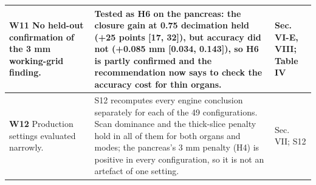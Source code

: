 \documentclass[11pt]{article}
\begin{document}
\begin{longtable}{@{}>{\raggedright\arraybackslash}p{}>{\raggedright\arraybackslash}p{}>{\raggedright\arraybackslash}p{}@{}}
\textbf{W11} No held-out confirmation of the 3 mm working-grid finding. & Tested as H6 on the pancreas: the closure gain at 0.75 decimation held (+25 points [17, 32]), but accuracy did not (+0.085 mm [0.034, 0.143]), so H6 is partly confirmed and the recommendation now says to check the accuracy cost for thin organs. & Sec. VI-E, VIII; Table IV \\ \midrule
\textbf{W12} Production settings evaluated narrowly. & S12 recomputes every engine conclusion separately for each of the 49 configurations. Scan dominance and the thick-slice penalty hold in all of them for both organs and modes; the pancreas's 3 mm penalty (H4) is positive in every configuration, so it is not an artefact of one setting. & Sec. VII; S12 \\ \bottomrule
\end{longtable}
\end{document}
